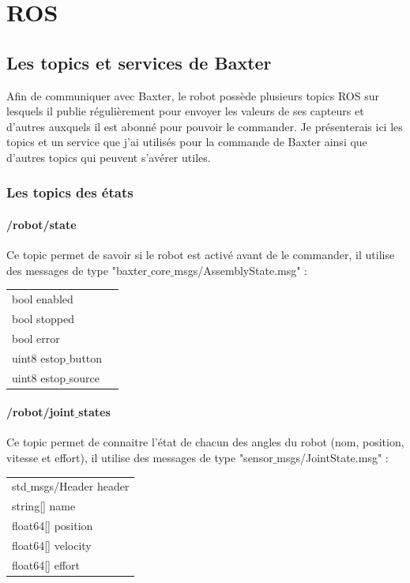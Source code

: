 \documentclass[a4paper,french, titlepage]{book}
\begin{document}
\newpage
\chapter{ROS}



\section{Les topics et services de Baxter}

Afin de communiquer avec Baxter, le robot possède plusieurs topics ROS sur lesquels il publie régulièrement pour envoyer les valeurs de ses capteurs et d'autres auxquels il est abonné pour pouvoir le commander. Je présenterais ici les topics et un service que j'ai utilisés pour la commande de Baxter ainsi que d'autres topics qui peuvent s'avérer utiles.

\subsection{Les topics des états}

\subsubsection{/robot/state}

Ce topic permet de savoir si le robot est activé avant de le commander, il utilise des messages de type "baxter$\_$core$\_$msgs/AssemblyState.msg" :\\

\begin{tabular}{ll}
bool enabled & \\
bool stopped & \\
bool error & \\
uint8 estop$\_$button & \\
uint8 estop$\_$source & \\
\end{tabular}



\subsubsection{/robot/joint$\_$states}

Ce topic permet de connaitre l'état de chacun des angles du robot (nom, position, vitesse et effort), il utilise des messages de type "sensor$\_$msgs/JointState.msg" :\\

\begin{tabular}{l}
std$\_$msgs/Header header\\
string[] name\\
float64[] position\\
float64[] velocity\\
float64[] effort\\
\end{tabular}
\end{document}
